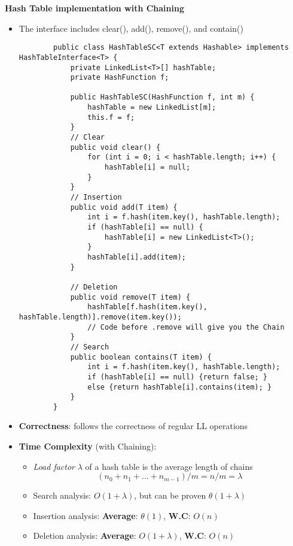 \documentclass[10pt, 
a4paper, 
oneside, 
headinclude, footinclude, 
BCOR5mm]
{scrartcl}
\begin{document}
\textbf{Hash Table implementation with Chaining}
\begin{itemize}
    \item The interface includes clear(), add(), remove(), and contain()
    \begin{lstlisting}
        public class HashTableSC<T extends Hashable> implements HashTableInterface<T> {
            private LinkedList<T>[] hashTable;
            private HashFunction f;

            public HashTableSC(HashFunction f, int m) {
                hashTable = new LinkedList[m];
                this.f = f;
            }
            // Clear 
            public void clear() {
                for (int i = 0; i < hashTable.length; i++) {
                    hashTable[i] = null;
                }
            }
            // Insertion 
            public void add(T item) {
                int i = f.hash(item.key(), hashTable.length);
                if (hashTable[i] == null) {
                    hashTable[i] = new LinkedList<T>();
                }
                hashTable[i].add(item);
            }

            // Deletion
            public void remove(T item) {
                hashTable[f.hash(item.key(), hashTable.length)].remove(item.key());
                // Code before .remove will give you the Chain
            }
            // Search
            public boolean contains(T item) {
                int i = f.hash(item.key(), hashTable.length);
                if (hashTable[i] == null) {return false; }
                else {return hashTable[i].contains(item); }
            }
        }
    \end{lstlisting}
    \item \textbf{Correctness}: follows the correctness of regular LL operations
    \item \textbf{Time Complexity} (with Chaining):
    \begin{itemize}
        \item \textit{Load factor} $\lambda$ of a hash table is the average length of chains $$(n_0+n_1+...+n_{m-1})/m = n/m = \lambda$$
        \item Search analysis: $O(1+\lambda)$, but can be proven $\theta(1+\lambda)$ 
        \item Insertion analysis: \textbf{Average}: $\theta(1)$, \textbf{W.C}: $O(n)$
        \item Deletion analysis: \textbf{Average}: $O(1+\lambda)$, \textbf{W.C}: $O(n)$
    \end{itemize}
\end{itemize}
\end{document}
